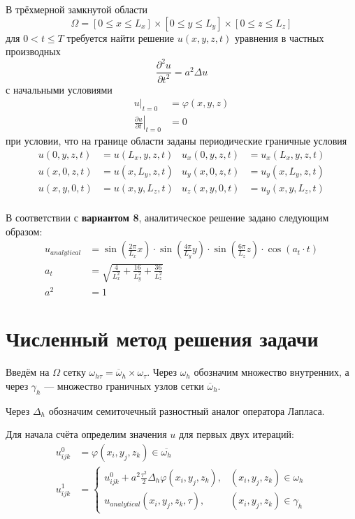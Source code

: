 \documentclass[a4paper,hidelinks,12pt]{article}
\begin{document}
В трёхмерной замкнутой области
% 
\[ \Omega  = [0 \leqslant x \leqslant L_x] \times [0 \leqslant y \leqslant L_y] \times [0 \leqslant z \leqslant L_z] \]
% 
\noindent для \( 0 < t \leqslant T \) требуется найти решение \( u(x,y,z,t) \) уравнения в частных производных
% 
\[ \frac{\partial ^ 2 u}{\partial t ^ 2} = a ^ 2 \Delta u \]
% 
\noindent с начальными условиями
% 
\begin{align*}
u |_{t=0} &= \varphi (x, y, z) \\
\left.\frac{\partial u}{\partial t}\right|_{t=0} &= 0
\end{align*}
% 
\noindent при условии, что на границе области заданы периодические граничные условия
% 
\begin{align*}
    u(0, y, z, t) &= u(L_x, y, z, t) & u_x(0, y, z, t) &= u_x(L_x, y, z, t) \\
    u(x, 0, z, t) &= u(x, L_y, z, t) & u_y(x, 0, z, t) &= u_y(x, L_y, z, t) \\
    u(x, y, 0, t) &= u(x, y, L_z, t) & u_z(x, y, 0, t) &= u_y(x, y, L_z, t) \\
\end{align*}

В соответствии с \textbf{вариантом 8}, аналитическое решение задано следующим образом:
% 
\begin{align*}
    u_{analytical} &= \sin{\left( \frac{2\pi}{L_x} x \right)}
        \cdot \sin{\left( \frac{4\pi}{L_y}y \right)}
        \cdot \sin{\left( \frac{6\pi}{L_z} z \right)}
        \cdot \cos{\left( a_t \cdot t \right)} \\
    a_t &= \sqrt{\frac{4}{L_x^2} + \frac{16}{L_y^2} + \frac{36}{L_z^2}} \\
    a^2 &= 1
\end{align*}

\newpage

\section{Численный метод решения задачи}

Введём на \( \Omega \) сетку \( \omega_{h\tau} = \overline{\omega}_h \times \omega_\tau \). Через \( \omega_h \) обозначим множество внутренних, а через \( \gamma_h \) --- множество граничных узлов сетки \( \overline{\omega}_h \).

Через $\Delta_h$ обозначим семиточечный разностный аналог оператора Лапласа.

Для начала счёта определим значения \( u \) для первых двух итераций:
% 
\begin{align*}
    u^0_{ijk} &= \varphi (x_i, y_j, z_k) \in \overline{\omega_h} \\
    u^1_{ijk} &=
      \begin{cases}
      u^0_{ijk} + a^2\frac{\tau^2}{2}\Delta_h\varphi(x_i,y_j,z_k), & (x_i, y_j, z_k) \in \omega_h \\
      u_{analytical}(x_i, y_j, z_k, \tau), & (x_i, y_j, z_k) \in \gamma_h
    \end{cases}
\end{align*}
\end{document}
